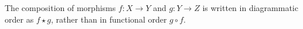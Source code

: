 \begin{notation}
    The composition of morphisms \( f : X \mathop{\to} Y \) and \( g : Y \mathop{\to} Z \) is written in diagrammatic order as \( f \mathop{\star} g \), rather than in functional order \( g \circ f \). 
\end{notation}  